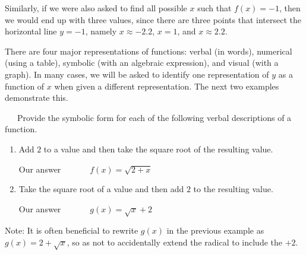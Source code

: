 Similarly, if we were also asked to find all possible $x$ such that $f(x)=-1$, then we would end up with three values, since there are three points that intersect the horizontal line $y=-1$, namely $x\approx -2.2$, $x=1$, and $x\approx 2.2$.\pp

There are four major representations of functions: verbal (in words), numerical (using a table), symbolic (with an algebraic expression), and visual (with a graph).  %
In many cases, we will be asked to identify one representation of $y$ as a function of $x$ when given a different representation.  The next two examples demonstrate this.\pp

\begin{example}~~~Provide the symbolic form for each of the following verbal descriptions of a function.
\begin{enumerate}
	\item Add $2$ to a value and then take the square root of the resulting value. 
\begin{center}
Our answer~~~~~~~$f(x)=\sqrt{2+x}$
\end{center}
	\item Take the square root of a value and then add $2$ to the resulting value.
\begin{center}
Our answer~~~~~~~$g(x)=\sqrt{x}+2$
\end{center}
\end{enumerate}
\end{example}
Note: It is often beneficial to rewrite $g(x)$ in the previous example as $g(x)=2+\sqrt{x}$, so as not to accidentally extend the radical to include the $+2$.
\newpage

